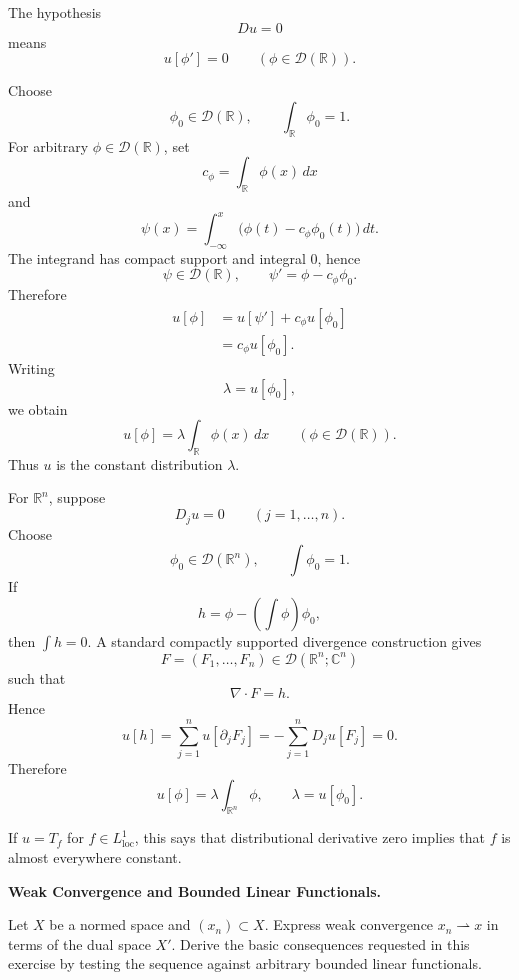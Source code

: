 \begin{solution}
The hypothesis
\[
Du=0
\]
means
\[
u[\phi']=0
\qquad
(\phi\in\mathcal D(\mathbb R)).
\]

Choose
\[
\phi_0\in\mathcal D(\mathbb R),
\qquad
\int_{\mathbb R}\phi_0=1.
\]
For arbitrary \(\phi\in\mathcal D(\mathbb R)\), set
\[
c_\phi=\int_{\mathbb R}\phi(x)\,dx
\]
and
\[
\psi(x)
=
\int_{-\infty}^{x}
\bigl(\phi(t)-c_\phi\phi_0(t)\bigr)\,dt.
\]
The integrand has compact support and integral \(0\), hence
\[
\psi\in\mathcal D(\mathbb R),
\qquad
\psi'=\phi-c_\phi\phi_0.
\]
Therefore
\[
\begin{aligned}
u[\phi]
&=
u[\psi']
+
c_\phi u[\phi_0]\\
&=
c_\phi u[\phi_0].
\end{aligned}
\]
Writing
\[
\lambda=u[\phi_0],
\]
we obtain
\[
\boxed{
u[\phi]
=
\lambda\int_{\mathbb R}\phi(x)\,dx
\qquad
(\phi\in\mathcal D(\mathbb R)).
}
\]
Thus \(u\) is the constant distribution \(\lambda\).

For \(\mathbb R^n\), suppose
\[
D_j u=0
\qquad(j=1,\ldots,n).
\]
Choose
\[
\phi_0\in\mathcal D(\mathbb R^n),
\qquad
\int\phi_0=1.
\]
If
\[
h=\phi-\left(\int\phi\right)\phi_0,
\]
then \(\int h=0\). A standard compactly supported divergence construction gives
\[
F=(F_1,\ldots,F_n)\in\mathcal D(\mathbb R^n;\mathbb C^n)
\]
such that
\[
\nabla\cdot F=h.
\]
Hence
\[
u[h]
=
\sum_{j=1}^{n}u[\partial_jF_j]
=
-\sum_{j=1}^{n}D_ju[F_j]
=
0.
\]
Therefore
\[
\boxed{
u[\phi]
=
\lambda\int_{\mathbb R^n}\phi,
\qquad
\lambda=u[\phi_0].
}
\]

If \(u=T_f\) for \(f\in L^1_{\mathrm{loc}}\), this says that distributional derivative zero implies that \(f\) is almost everywhere constant.
\end{solution}


\begin{problem}[CP-II-0293]
\label{prob:cp-ii-0293}
\textbf{Weak Convergence and Bounded Linear Functionals.}

\hspace*{1.5em}Let \(X\) be a normed space and \((x_n)\subset X\). Express weak convergence
\(x_n\rightharpoonup x\) in terms of the dual space \(X'\). Derive the basic
consequences requested in this exercise by testing the sequence against
arbitrary bounded linear functionals.
\end{problem}

